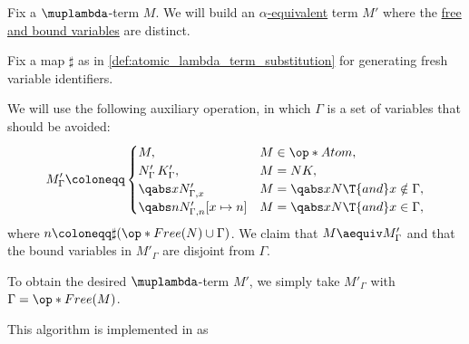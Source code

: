 \begin{algorithm}\label{alg:separation_of_free_and_bound_variables}
  Fix a \( \muplambda \)-term \( M \). We will build an \hyperref[def:lambda_term_alpha_equivalence]{\( \alpha \)-equivalent} term \( M' \) where the \hyperref[def:lambda_variable_freeness]{free and bound variables} are distinct.

  Fix a map \( \sharp \) as in \cref{def:atomic_lambda_term_substitution} for generating fresh variable identifiers.

  We will use the following auxiliary operation, in which \( \Gamma \) is a set of variables that should be avoided:
  \begin{equation*}
    M'_\Gamma \coloneqq \begin{cases}
      M,                                 &M \in \op*{Atom}, \\
      N'_\Gamma \thinspace K'_\Gamma,    &M = NK, \\
      \qabs x N'_{\Gamma,x}              &M = \qabs x N \T{and} x \notin \Gamma, \\
      \qabs n N'_{\Gamma,n}[x \mapsto n] &M = \qabs x N \T{and} x \in \Gamma,
    \end{cases}
  \end{equation*}
  where \( n \coloneqq \sharp(\op*{Free}(N) \cup \Gamma) \). We claim that \( M \aequiv M'_\Gamma \) and that the bound variables in \( M'_\Gamma \) are disjoint from \( \Gamma \).

  To obtain the desired \( \muplambda \)-term \( M' \), we simply take \( M'_\Gamma \) with \( \Gamma = \op*{Free}(M) \).
\end{algorithm}
\begin{comments}
  \item This algorithm is implemented in \cite{notebook:code} as
  \begin{CodeRefDisplay}
  \end{CodeRefDisplay}
\end{comments}
